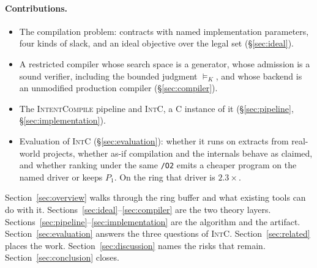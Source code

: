 \paragraph{Contributions.}
\begin{itemize}
  \item The compilation problem: contracts with named implementation
  parameters, four kinds of slack, and an ideal objective over the legal set
  (\S\ref{sec:ideal}).
  \item A restricted compiler whose search space is a generator, whose
  admission is a sound verifier, including the bounded judgment
  \(\models_K\), and whose backend is an unmodified production compiler
  (\S\ref{sec:compiler}).
  \item The \textsc{IntentCompile} pipeline and \textsc{IntC}, a C instance
  of it (\S\ref{sec:pipeline}, \S\ref{sec:implementation}).
  \item Evaluation of \textsc{IntC} (\S\ref{sec:evaluation}): whether it
  runs on extracts from real-world projects, whether as-if compilation and
  the internals behave as claimed, and whether ranking under the same
  \texttt{/O2} emits a cheaper program on the named driver or keeps
  \(P_1\). On the ring that driver is \(2.3\times\).
\end{itemize}

Section~\ref{sec:overview} walks through the ring buffer and what existing
tools can do with it. Sections~\ref{sec:ideal}--\ref{sec:compiler} are the two
theory layers. Sections~\ref{sec:pipeline}--\ref{sec:implementation} are the
algorithm and the artifact. Section~\ref{sec:evaluation} answers the three questions of \textsc{IntC}.
Section~\ref{sec:related} places the work. Section~\ref{sec:discussion}
names the risks that remain. Section~\ref{sec:conclusion} closes.

